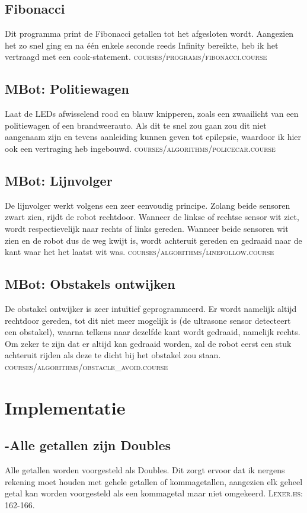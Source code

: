 \documentclass[12pt,a4paper]{report}
\begin{document}
\section{Fibonacci}
Dit programma print de Fibonacci getallen tot het afgesloten wordt. Aangezien het zo snel ging en na één enkele seconde reeds Infinity bereikte, heb ik het vertraagd met een cook-statement. \textsc{courses/programs/fibonacci.course}
\section{MBot: Politiewagen}
Laat de LEDs afwisselend rood en blauw knipperen, zoals een zwaailicht van een politiewagen of een brandweerauto. Als dit te snel zou gaan zou dit niet aangenaam zijn en tevens aanleiding kunnen geven tot epilepsie, waardoor ik hier ook een vertraging heb ingebouwd. \textsc{courses/algorithms/policecar.course}
\section{MBot: Lijnvolger}
De lijnvolger werkt volgens een zeer eenvoudig principe. Zolang beide sensoren zwart zien, rijdt de robot rechtdoor. Wanneer de linkse of rechtse sensor wit ziet, wordt respectievelijk naar rechts of links gereden. Wanneer beide sensoren wit zien en de robot dus de weg kwijt is, wordt achteruit gereden en gedraaid naar de kant waar het het laatst wit was. \textsc{courses/algorithms/linefollow.course}
\section{MBot: Obstakels ontwijken}
De obstakel ontwijker is zeer intuïtief geprogrammeerd. Er wordt namelijk altijd rechtdoor gereden, tot dit niet meer mogelijk is (de ultrasone sensor detecteert een obstakel), waarna telkens naar dezelfde kant wordt gedraaid, namelijk rechts. Om zeker te zijn dat er altijd kan gedraaid worden, zal de robot eerst een stuk achteruit rijden als deze te dicht bij het obstakel zou staan. \textsc{courses/algorithms/obstacle\_avoid.course}
\chapter{Implementatie}
\section{-Alle getallen zijn Doubles}
Alle getallen worden voorgesteld als Doubles. Dit zorgt ervoor dat ik nergens rekening moet houden met gehele getallen of kommagetallen, aangezien elk geheel getal kan worden voorgesteld als een kommagetal maar niet omgekeerd. \textsc{Lexer.hs: 162-166.}
\end{document}
